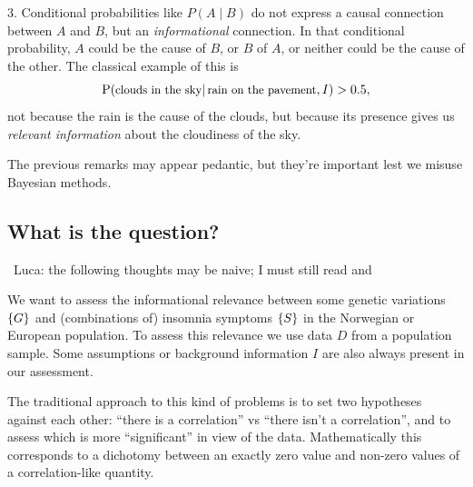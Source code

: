 \documentclass[\ifafour a4paper,12pt,\else a5paper,10pt,\fi%
onecolumn,oneside,article,%
british%
]{memoir}
\theoremstyle{remark}
\theoremstyle{innote}
\newcommand*{\citep}{\parencites}
\DeclarePairedDelimiter\set{\{}{\}}
\newcommand*{\p}{\mathrm{P}}%
\renewcommand*{\|}{\mathpunct{|}}
\newcommand*{\puzzle}{\maltese}
\newcommand{\mynote}[1]{ {\color{notecolour}\puzzle\ #1}}
\newcommand*{\yD}{D}
\newcommand*{\yG}{G}
\newcommand*{\yS}{S}
\newcommand*{\yI}{I}
\begin{document}
\medskip

3. Conditional probabilities like $P(A \| B)$ do not express a causal
connection between $A$ and $B$, but an \emph{informational} connection. In
that conditional probability, $A$ could be the cause of $B$, or $B$ of $A$,
or neither could be the cause of the other. The classical example of this is
\begin{equation}
  \label{eq:rain_clouds}
  \p(\text{\small clouds in the sky} \| \text{\small rain on the pavement}, I) > 0.5,
\end{equation}
not because the rain is the cause of the clouds, but because its presence gives us
\emph{relevant information} about the cloudiness of the sky.

\medskip

The previous remarks may appear pedantic, but they're important lest we
misuse Bayesian methods.

\subsection{What is the question?}
\label{sec:what_question}

\mynote{Luca: the following thoughts may be naive; I must still read
  \citep{stingoetal2015} and \citep{bushetal2012}}

We want to assess the informational relevance between some genetic
variations $\set{\yG}$ and (combinations of) insomnia symptoms $\set{\yS}$
in the Norwegian or European population. To assess this relevance we use
data $\yD$ from a population sample. Some assumptions or background
information $\yI$ are also always present in our assessment.

The traditional approach to this kind of problems is to set two hypotheses
against each other: \enquote{there is a correlation} vs \enquote{there
  isn't a correlation}, and to assess which is more \enquote{significant}
in view of the data. Mathematically this corresponds to a dichotomy between
an exactly zero value and non-zero values of a correlation-like quantity.
\end{document}
